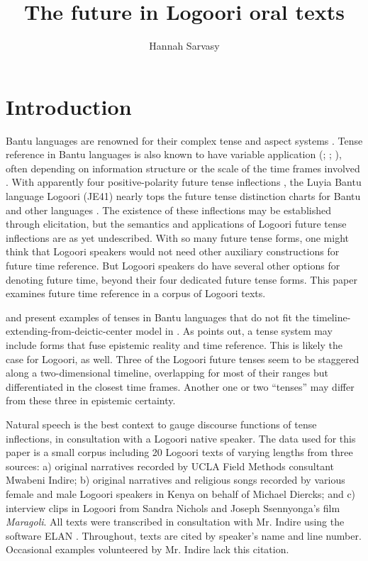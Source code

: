 \documentclass[output=paper]{langsci/langscibook}
\title{The future in Logoori oral texts}
\author{%
Hannah Sarvasy \affiliation{Australian National University} 
}
\begin{document}
\section{Introduction} \label{sec:sarvasy:1}

Bantu languages are renowned for their complex tense and aspect systems \citep{Nurse2003,Nurse2008}. Tense reference in Bantu languages is also known to have variable application (\citealt{Besha1989}; \citealt[101]{Nurse2003}; \citealt{Crane2011}), often depending on information structure or the scale of the time frames involved \citep{BotneKershner2008,Botne2013}. With apparently four positive-polarity future tense inflections \citep{Mould1981,Leung1991,Nurse2003}, the Luyia Bantu language Logoori (JE41) nearly tops the future tense distinction charts for Bantu and other languages \citep[89]{Nurse2008}. The existence of these inflections may be established through elicitation, but the semantics and applications of Logoori future tense inflections are as yet undescribed. With so many future tense forms, one might think that Logoori speakers would not need other auxiliary constructions for future time reference. But Logoori speakers do have several other options for denoting future time, beyond their four dedicated future tense forms. This paper examines future time reference in a corpus of Logoori texts.

\citet{BotneKershner2008} and \citet{Botne2013} present examples of tenses in Bantu languages that do not fit the timeline-extending-from-deictic-center model in \citet{Comrie1985}. As \citet{Botne2013} points out, a tense system may include forms that fuse epistemic reality and time reference. This is likely the case for Logoori, as well. Three of the Logoori future tenses seem to be staggered along a two-dimensional timeline, overlapping for most of their ranges but differentiated in the closest time frames. Another one or two “tenses” may differ from these three in epistemic certainty. 

Natural speech is the best context to gauge discourse functions of tense inflections, in consultation with a Logoori native speaker. The data used for this paper is a small corpus including 20 Logoori texts of varying lengths from three sources: a) original narratives recorded by UCLA Field Methods consultant Mwabeni Indire; b) original narratives and religious songs recorded by various female and male Logoori speakers in Kenya on behalf of Michael Diercks; and c) interview clips in Logoori from Sandra Nichols and Joseph Ssennyonga’s \citeyear{NicholsSsennyonga1976} film \textit{Maragoli}. All texts were transcribed in consultation with Mr. Indire using the software ELAN \citep{SloetjesWittenberg2008}. Throughout, texts are cited by speaker’s name and line number. Occasional examples volunteered by Mr. Indire lack this citation.
\end{document}
